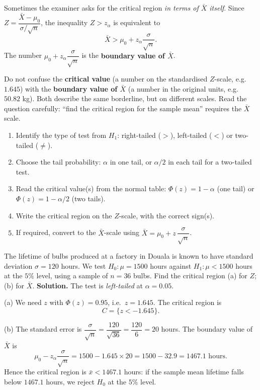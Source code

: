 \documentclass[11pt]{article}
\begin{document}
Sometimes the examiner asks for the critical region \emph{in terms of $\bar{X}$ itself}. Since $Z = \dfrac{\bar{X} - \mu_0}{\sigma/\sqrt{n}}$, the inequality $Z > z_\alpha$ is equivalent to
\[ \bar{X} > \mu_0 + z_\alpha \frac{\sigma}{\sqrt{n}}. \]
The number $\mu_0 + z_\alpha \dfrac{\sigma}{\sqrt{n}}$ is the \textbf{boundary value of $\bar{X}$}.

\begin{attention}
Do not confuse the \textbf{critical value} (a number on the standardised $Z$-scale, e.g.\ $1.645$) with the \textbf{boundary value of $\bar{X}$} (a number in the original units, e.g.\ $50.82$ kg). Both describe the same borderline, but on different scales. Read the question carefully: ``find the critical region for the sample mean'' requires the $\bar{X}$ scale.
\end{attention}

\begin{methode}
\begin{enumerate}
\item Identify the type of test from $H_1$: right-tailed ($>$), left-tailed ($<$) or two-tailed ($\ne$).
\item Choose the tail probability: $\alpha$ in one tail, or $\alpha/2$ in each tail for a two-tailed test.
\item Read the critical value(s) from the normal table: $\Phi(z) = 1 - \alpha$ (one tail) or $\Phi(z) = 1 - \alpha/2$ (two tails).
\item Write the critical region on the $Z$-scale, with the correct sign(s).
\item If required, convert to the $\bar{X}$-scale using $\bar{X} = \mu_0 + z\,\dfrac{\sigma}{\sqrt{n}}$.
\end{enumerate}
\end{methode}

\begin{exoresolu}
The lifetime of bulbs produced at a factory in Douala is known to have standard deviation $\sigma = 120$ hours. We test $H_0 : \mu = 1500$ hours against $H_1 : \mu < 1500$ hours at the $5\%$ level, using a sample of $n = 36$ bulbs. Find the critical region (a) for $Z$; (b) for $\bar{X}$.
\tcblower
\textbf{Solution.} The test is \emph{left-tailed} at $\alpha = 0.05$.

(a) We need $z$ with $\Phi(z) = 0.95$, i.e.\ $z = 1.645$. The critical region is
\[ C = \{z < -1.645\}. \]

(b) The standard error is $\dfrac{\sigma}{\sqrt{n}} = \dfrac{120}{\sqrt{36}} = \dfrac{120}{6} = 20$ hours. The boundary value of $\bar{X}$ is
\[ \mu_0 - z_\alpha\frac{\sigma}{\sqrt{n}} = 1500 - 1.645 \times 20 = 1500 - 32.9 = 1467.1 \text{ hours}. \]
Hence the critical region is $\bar{x} < 1467.1$ hours: if the sample mean lifetime falls below $1467.1$ hours, we reject $H_0$ at the $5\%$ level.
\end{exoresolu}
\end{document}
